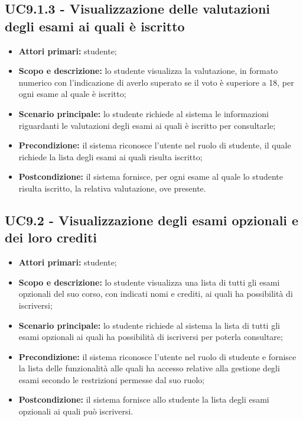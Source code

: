 \documentclass[AnalisiDeiRequisiti.tex]{subfiles}
\begin{document}
\subsection{UC9.1.3 - Visualizzazione delle valutazioni degli esami ai quali è iscritto}
\begin{itemize}
	\item \textbf{Attori primari:} studente;
	\item \textbf{Scopo e descrizione:} lo studente visualizza la valutazione, in formato numerico con l'indicazione di averlo superato se il voto è superiore a 18, per ogni esame al quale è iscritto;
	\item \textbf{Scenario principale:} lo studente richiede al sistema le informazioni riguardanti le valutazioni degli esami ai quali è iscritto per consultarle;
	\item \textbf{Precondizione:} il sistema riconosce l'utente nel ruolo di studente, il quale richiede la lista degli esami ai quali risulta iscritto; 
	\item \textbf{Postcondizione:} il sistema fornisce, per ogni esame al quale lo studente risulta iscritto, la relativa valutazione, ove presente.
\end{itemize}

\subsection{UC9.2 - Visualizzazione degli esami opzionali e dei loro crediti}
\begin{itemize}
	\item \textbf{Attori primari:} studente;
	\item \textbf{Scopo e descrizione:} lo studente visualizza una lista di tutti gli esami opzionali del suo corso, con indicati nomi e crediti, ai quali ha possibilità di iscriversi;
	\item \textbf{Scenario principale:} lo studente richiede al sistema la lista di tutti gli esami opzionali ai quali ha possibilità di iscriversi per poterla consultare;
	\item \textbf{Precondizione:} il sistema riconosce l'utente nel ruolo di studente e fornisce la lista delle funzionalità alle quali ha accesso relative alla gestione degli esami secondo le restrizioni permesse dal suo ruolo; 
\item \textbf{Postcondizione:} il sistema fornisce allo studente la lista degli esami opzionali ai quali può iscriversi.
\end{itemize}
\end{document}
